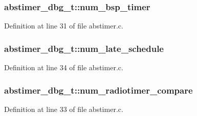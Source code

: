 \subsubsection[{\texorpdfstring{num\+\_\+bsp\+\_\+timer}{num_bsp_timer}}]{ abstimer\+\_\+dbg\+\_\+t\+::num\+\_\+bsp\+\_\+timer}\hypertarget{structabstimer__dbg__t_a62760a47e0b9b9b9e01298e521a16263}{}\label{structabstimer__dbg__t_a62760a47e0b9b9b9e01298e521a16263}


Definition at line 31 of file abstimer.\+c.

\subsubsection[{\texorpdfstring{num\+\_\+late\+\_\+schedule}{num_late_schedule}}]{ abstimer\+\_\+dbg\+\_\+t\+::num\+\_\+late\+\_\+schedule}\hypertarget{structabstimer__dbg__t_a3c612a828b353e34d8bf1198dad4ac87}{}\label{structabstimer__dbg__t_a3c612a828b353e34d8bf1198dad4ac87}


Definition at line 34 of file abstimer.\+c.

\subsubsection[{\texorpdfstring{num\+\_\+radiotimer\+\_\+compare}{num_radiotimer_compare}}]{ abstimer\+\_\+dbg\+\_\+t\+::num\+\_\+radiotimer\+\_\+compare}\hypertarget{structabstimer__dbg__t_a4562acb4e2448d20b7689573eb0576f1}{}\label{structabstimer__dbg__t_a4562acb4e2448d20b7689573eb0576f1}


Definition at line 33 of file abstimer.\+c.

